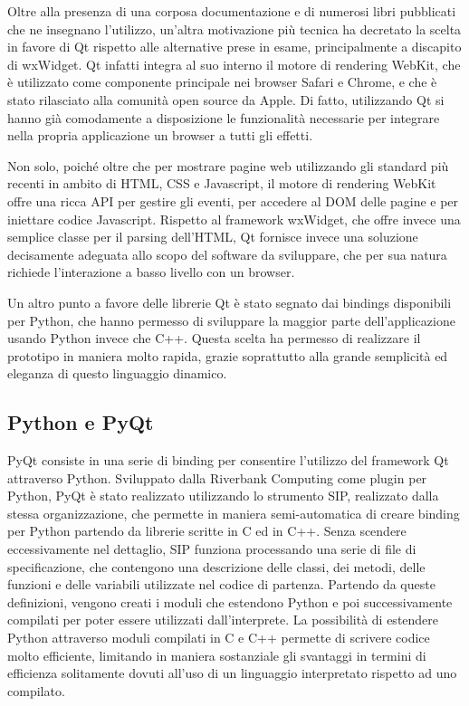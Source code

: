 \documentclass[12pt]{toptesi}
\begin{document}
Oltre alla presenza di una corposa documentazione e di numerosi libri pubblicati che ne insegnano l'utilizzo, un'altra motivazione più tecnica ha decretato la scelta in favore di Qt rispetto alle alternative prese in esame, principalmente a discapito di wxWidget. Qt infatti integra al suo interno il motore di rendering WebKit, che è utilizzato come componente principale nei browser Safari e Chrome, e che è stato rilasciato alla comunità open source da Apple. Di fatto, utilizzando Qt si hanno già comodamente a disposizione le funzionalità necessarie per integrare nella propria applicazione un browser a tutti gli effetti. 

Non solo, poiché oltre che per mostrare pagine web utilizzando gli standard più recenti in ambito di HTML, CSS e Javascript, il motore di rendering WebKit offre una ricca API per gestire gli eventi, per accedere al DOM delle pagine e per iniettare codice Javascript. Rispetto al framework wxWidget, che offre invece una semplice classe per il parsing dell'HTML, Qt  fornisce invece una soluzione decisamente adeguata allo scopo del software da sviluppare, che per sua natura richiede l'interazione a basso livello con un browser.

Un altro punto a favore delle librerie Qt è stato segnato dai bindings disponibili per Python, che hanno permesso di sviluppare la maggior parte dell'applicazione usando Python invece che C++. Questa scelta ha permesso di realizzare il prototipo in maniera molto rapida, grazie soprattutto alla grande semplicità ed eleganza di questo linguaggio dinamico.

\subsection{Python e PyQt}

PyQt consiste in una serie di binding per consentire l'utilizzo del framework Qt attraverso Python. Sviluppato dalla Riverbank Computing come plugin per Python, PyQt è stato realizzato utilizzando lo strumento SIP, realizzato dalla stessa organizzazione, che permette in maniera semi-automatica di creare binding per Python partendo da librerie scritte in C ed in C++. Senza scendere eccessivamente nel dettaglio, SIP funziona processando una serie di file di specificazione, che contengono una descrizione delle classi, dei metodi, delle funzioni e delle variabili utilizzate nel codice di partenza. Partendo da queste definizioni, vengono creati i moduli che estendono Python e poi successivamente compilati per poter essere utilizzati dall'interprete. La possibilità di estendere Python attraverso moduli compilati in C e C++ permette di scrivere codice molto efficiente, limitando in maniera sostanziale gli svantaggi in termini di efficienza solitamente dovuti all'uso di un linguaggio interpretato rispetto ad uno compilato.
\end{document}
